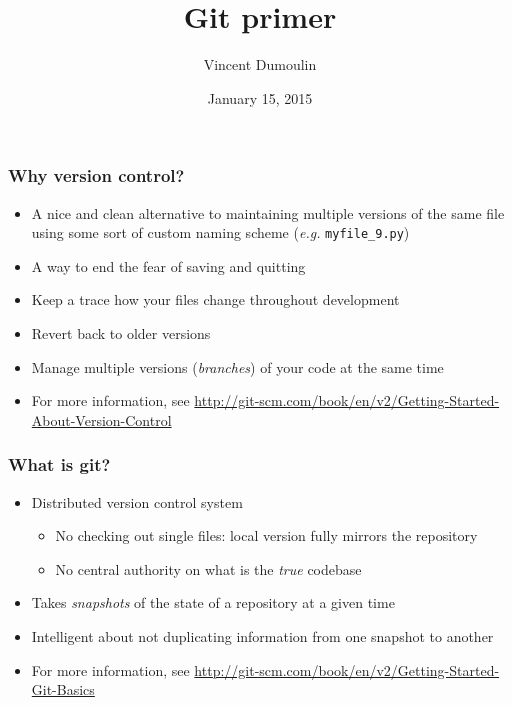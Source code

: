 \documentclass[mathserif, xcolor=dvipsnames]{beamer}
\title{Git primer}
\author{Vincent Dumoulin}
\date{January 15, 2015}
\begin{document}
\begin{frame}[plain]
    \titlepage
\end{frame}

\begin{frame}
    \frametitle{Why version control?}
    \begin{itemize} \addtolength{\itemsep}{0.5\baselineskip}
        \item{A nice and clean alternative to maintaining multiple versions of
              the same file using some sort of custom naming scheme
              (\emph{e.g.} \texttt{myfile\_9.py})}
        \item{A way to end the fear of saving and quitting}
        \item{Keep a trace how your files change throughout development}
        \item{Revert back to older versions}
        \item{Manage multiple versions (\emph{branches}) of your code at the
              same time}
        \item{For more information, see
              \url{http://git-scm.com/book/en/v2/Getting-Started-About-Version-Control}}
    \end{itemize}
\end{frame}

\begin{frame}
    \frametitle{What is git?}
    \begin{itemize}\addtolength{\itemsep}{0.5\baselineskip}
        \item{Distributed version control system
              \begin{itemize}
                  \item{No checking out single files: local version fully
                        mirrors the repository}
                  \item{No central authority on what is the \emph{true}
                        codebase}
               \end{itemize}}
        \item{Takes \emph{snapshots} of the state of a repository at a given
              time}
        \item{Intelligent about not duplicating information from one snapshot
              to another}
        \item{For more information, see
              \url{http://git-scm.com/book/en/v2/Getting-Started-Git-Basics}}
    \end{itemize}
\end{frame}
\end{document}

